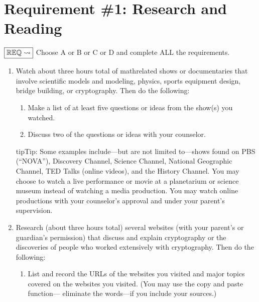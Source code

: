 \documentclass[letterpaper,10pt,english,openany,oneside]{sphinxmanual}
\begin{document}
\chapter{Requirement \#1: Research and Reading}
\label{\detokenize{requirement1:requirement-1-research-and-reading}}\label{\detokenize{requirement1::doc}}
\(\boxed{\mathbb{REQ}\Large \rightsquigarrow}\) Choose A or B or C or D and complete ALL the requirements.
\begin{enumerate}
%
\item {} 
Watch about three hours total of math\sphinxhyphen{}related shows or documentaries that involve scientific models and modeling, physics, sports equipment design, bridge building, or cryptography. Then do the following:
\begin{enumerate}
%
\item {} 
Make a list of at least five questions or ideas from the show(s) you watched.

\item {} 
Discuss two of the questions or ideas with your counselor.

\end{enumerate}

\begin{sphinxadmonition}{tip}{Tip:}
Some examples include—but are not limited to—shows found on PBS (“NOVA”), Discovery Channel, Science Channel, National Geographic Channel, TED Talks (online videos), and the History Channel. You may choose to watch a live performance or movie at a planetarium or science museum instead of watching a media production. You may watch online productions with your counselor’s approval and under your parent’s supervision.
\end{sphinxadmonition}

\item {} 
Research (about three hours total) several websites (with your parent’s or guardian’s permission) that discuss and explain cryptography or the discoveries of people who worked extensively with cryptography. Then do the following:
\begin{enumerate}
%
\item {} 
List and record the URLs of the websites you visited and major topics covered on the websites you visited. (You may use the copy and paste function— eliminate the words—if you include your sources.)


\end{enumerate}
\end{enumerate}
\end{document}
